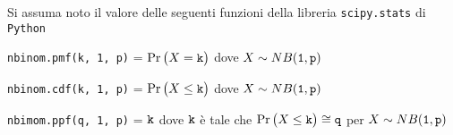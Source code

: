 \documentclass[11pt,twoside,a4paper]{article}
\begin{document}
\vfill
\hrulefill

Si assuma noto il valore delle seguenti funzioni della libreria {\tt scipy.stats\/} di  {\tt Python\/}

{\tt nbinom.pmf(k, 1, p)} = $\Pr\big(X={\tt k}\big)$ dove $X\sim NB({\tt 1},{\tt p})$ 

{\tt nbinom.cdf(k, 1, p)} = $\Pr\big(X\le{\tt k}\big)$ dove  $X\sim NB({\tt 1},{\tt p})$ 

{\tt nbimom.ppf(q, 1, p)} = ${\tt k}$ dove ${\tt k}$ è tale che $\Pr\big(X\le{\tt k}\big)\cong{\tt q}$ per $X\sim NB({\tt 1},{\tt p})$ 
\end{document}
